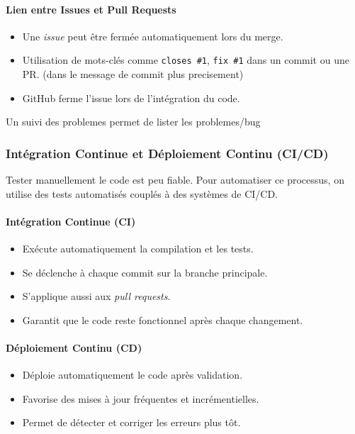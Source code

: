 \documentclass{article}
\begin{document}
\paragraph{Lien entre Issues et Pull Requests}
\begin{itemize}
    \item Une \textit{issue} peut être fermée automatiquement lors du merge.
    \item Utilisation de mots-clés comme \texttt{closes \#1}, \texttt{fix \#1} dans un commit ou une PR. (dans le message de commit plus precisement)
    \item GitHub ferme l’issue lors de l’intégration du code.
\end{itemize}

Un suivi des problemes permet de lister les problemes/bug 

\subsubsection{Intégration Continue et Déploiement Continu (CI/CD)}

Tester manuellement le code est peu fiable. Pour automatiser ce processus, on utilise des tests automatisés couplés à des systèmes de CI/CD.

\paragraph{Intégration Continue (CI)}
\begin{itemize}
    \item Exécute automatiquement la compilation et les tests.
    \item Se déclenche à chaque commit sur la branche principale.
    \item S’applique aussi aux \textit{pull requests}.
    \item Garantit que le code reste fonctionnel après chaque changement.
\end{itemize}

\paragraph{Déploiement Continu (CD)}
\begin{itemize}
    \item Déploie automatiquement le code après validation.
    \item Favorise des mises à jour fréquentes et incrémentielles.
    \item Permet de détecter et corriger les erreurs plus tôt.
\end{itemize}
\end{document}
